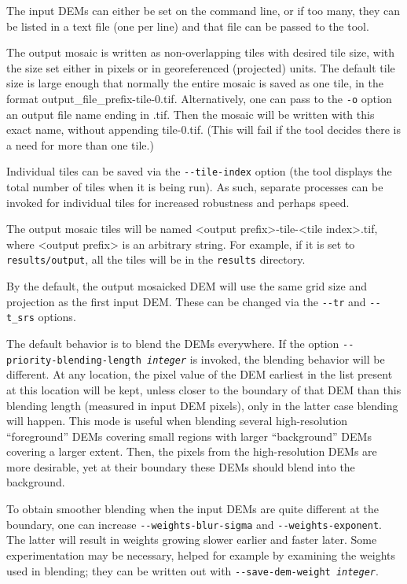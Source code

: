 The input DEMs can either be set on the command line, or if too
many, they can be listed in a text file (one per line) and that file can
be passed to the tool.

The output mosaic is written as non-overlapping tiles with desired tile
size, with the size set either in pixels or in georeferenced (projected)
units. The default tile size is large enough that normally the entire
mosaic is saved as one tile, in the format
output\_file\_prefix-tile-0.tif.  Alternatively, one can pass to the
\texttt{-o} option an output file name ending in .tif. Then the
mosaic will be written with this exact name, without appending
tile-0.tif. (This will fail if the tool decides there is a need for more
than one tile.)

Individual tiles can be saved via the \texttt{-\/-tile-index} option
(the tool displays the total number of tiles when it is being run). As
such, separate processes can be invoked for individual tiles for
increased robustness and perhaps speed.

The output mosaic tiles will be named <output prefix>-tile-<tile
index>.tif, where <output prefix> is an arbitrary string. For example,
if it is set to \texttt{results/output}, all the tiles will be in the
\texttt{results} directory.

By the default, the output mosaicked \ac{DEM} will use the same grid size and
projection as the first input \ac{DEM}. These can be changed via the
\texttt{-\/-tr} and \texttt{-\/-t\_srs} options.

The default behavior is to blend the DEMs everywhere. If the option
\texttt{-\/-priority-blending-length \textit{integer}} is invoked, the
blending behavior will be different. At any location, the pixel value of
the DEM earliest in the list present at this location will be kept,
unless closer to the boundary of that DEM than this blending length
(measured in input DEM pixels), only in the latter case blending will happen. This
mode is useful when blending several high-resolution ``foreground'' DEMs
covering small regions with larger ``background'' DEMs covering a larger
extent. Then, the pixels from the high-resolution DEMs are more
desirable, yet at their boundary these DEMs should blend into the
background.

To obtain smoother blending when the input DEMs are quite different at
the boundary, one can increase \texttt{-\/-weights-blur-sigma} and
\texttt{-\/-weights-exponent}. The latter will result in weights growing
slower earlier and faster later. Some experimentation may be necessary,
helped for example by examining the weights used in blending; they can be
written out with \texttt{-\/-save-dem-weight \textit{integer}}.


